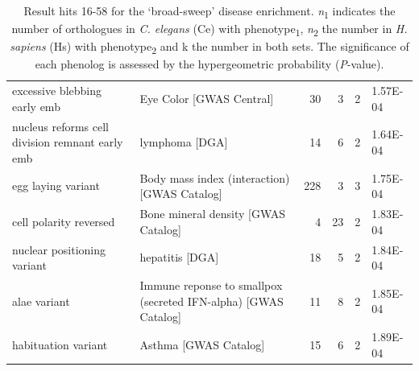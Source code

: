 \begin{table}
\begin{tabulary}{\linewidth}{LLRRRL}
  excessive blebbing early emb & Eye Color [GWAS Central] & 30 & 3 & 2 & 1.57E-04 \\
  nucleus reforms cell division remnant early emb & lymphoma [DGA] & 14 & 6 & 2 & 1.64E-04 \\
  egg laying variant & Body mass index (interaction) [GWAS Catalog] & 228 & 3 & 3 & 1.75E-04 \\
  cell polarity reversed & Bone mineral density [GWAS Catalog] & 4 & 23 & 2 & 1.83E-04 \\
  nuclear positioning variant & hepatitis [DGA] & 18 & 5 & 2 & 1.84E-04 \\
  alae variant & Immune reponse to smallpox (secreted IFN-alpha) [GWAS Catalog] & 11 & 8 & 2 & 1.85E-04 \\
  habituation variant & Asthma [GWAS Catalog] & 15 & 6 & 2 & 1.89E-04 \\
  \hline
\end{tabulary}
\caption[Result hits 16-58 for the disease enrichment]{Result hits 16-58 for the ‘broad-sweep’ disease enrichment. \textsl{n}\textsubscript{1} indicates the number of orthologues in \textsl{C. elegans} (Ce) with phenotype\textsubscript{1}, \textsl{n}\textsubscript{2} the number in \textsl{H. sapiens} (Hs) with phenotype\textsubscript{2} and k the number in both sets. The significance of each phenolog is assessed by the hypergeometric probability (\textsl{P}-value).}
\label{table:wormqtl_enrichment_suppl1}
\end{table}

